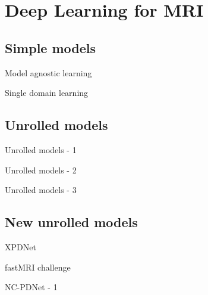 \documentclass[aspectratio=169,xcolor=dvipsnames]{beamer}
\begin{document}

\section{Deep Learning for MRI}
\subsection{Simple models}
\begin{frame}{Model agnostic learning}
\end{frame}

\begin{frame}{Single domain learning}
\end{frame}

\subsection{Unrolled models}
\begin{frame}{Unrolled models - 1}
\end{frame}

\begin{frame}{Unrolled models - 2}
\end{frame}

\begin{frame}{Unrolled models - 3}

\end{frame}

\subsection{New unrolled models}
\begin{frame}{XPDNet}
\end{frame}

\begin{frame}{fastMRI challenge}
\end{frame}

\begin{frame}{NC-PDNet - 1}
\end{frame}
\end{document}
